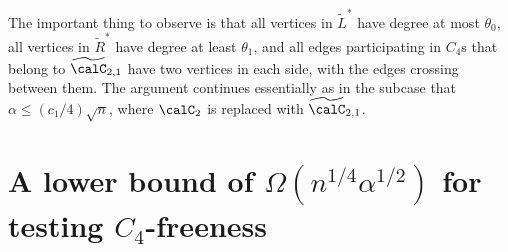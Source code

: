 \documentclass{article}
\begin{document}
The important thing to observe is that all vertices in $\widetilde{L}^*$ have degree at most $\theta_0$, all vertices in $\widetilde{R}^*$ have degree at least $\theta_1$, and all edges participating in $C_4$s that belong to $\widetilde{\calC}_{2,1}$ have two vertices in each side, with the edges crossing between them.
The argument continues essentially as in the subcase that $\alpha \leq (c_1/4)\sqrt{n}$, where $\calC_2$ is replaced with $\widetilde{\calC}_{2,1}$.



\section{A lower bound of $\Omega(n^{1/4}\alpha^{1/2})$ for testing $C_4$-freeness}\label{sec:C4-lb}


%














%






\end{document}
